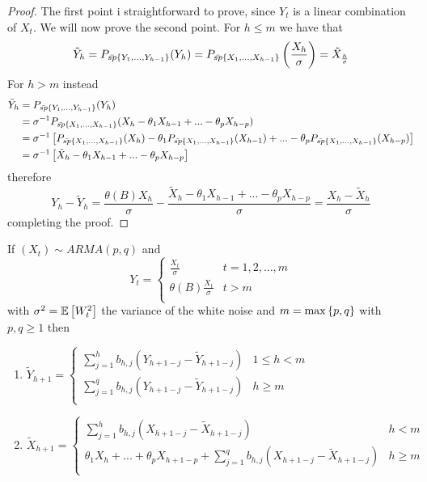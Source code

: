 \begin{proof}
    The first point i straightforward to prove, since $Y_t$ is a linear combination of $X_t$. We will now prove the second point. For $h\le m$ we have that
    \[
      \tilde{Y}_h=P_{\bar{sp}\left\{Y_1,...,Y_{h-1}\right\}}(Y_h)=P_{\bar{sp}\left\{X_1,...,X_{h-1}\right\}}\left(\frac{X_h}{\sigma}\right)=\tilde{X}_{\frac{h}{\sigma}}  
    \]
    For $h>m$ instead
    \begin{equation*}
        \begin{split}
            \tilde{Y}_h&=P_{\bar{sp}\left\{Y_1,...,Y_{h-1}\right\}}(Y_h)\\
            &=\sigma^{-1}P_{\bar{sp}\left\{X_1,...,X_{h-1}\right\}}(X_h-\theta_1X_{h-1}+...-\theta_pX_{h-p})\\
            &=\sigma^{-1}\left[P_{\bar{sp}\left\{X_1,...,X_{h-1}\right\}}(X_h)-\theta_1P_{\bar{sp}\left\{X_1,...,X_{h-1}\right\}}(X_{h-1})+...-\theta_pP_{\bar{sp}\left\{X_1,...,X_{h-1}\right\}}(X_{h-p})\right]\\
            &=\sigma^{-1}\left[\tilde{X}_h-\theta_1X_{h-1}+...-\theta_pX_{h-p}\right]\\
        \end{split}
    \end{equation*}
    therefore
    \[
        Y_h-\tilde{Y}_h=\frac{\theta(B)X_h}{\sigma}-\frac{\tilde{X}_h-\theta_1X_{h-1}+...-\theta_pX_{h-p}}{\sigma}=\frac{X_h-\tilde{X}_h}{\sigma}
    \]  
    completing the proof.
\end{proof}

\begin{proposition}
    If $(X_t)\sim ARMA(p,q)$ and    
    \[
        Y_t=
        \begin{cases}
            \frac{X_t}{\sigma}&t=1,2,...,m\\
            \theta(B)\frac{X_t}{\sigma}&t>m\\
        \end{cases}  
    \]
    with $\sigma^2=\mathbb{E}\left[W_t^2\right]$ the variance of the white noise and $m=\max\left\{p,q\right\}$ with $p,q\ge1$ then
    \begin{enumerate}
        \item $\tilde{Y}_{h+1}=
            \begin{cases}
                \sum_{j=1}^hb_{h,j}(Y_{h+1-j}-\tilde{Y}_{h+1-j})&1\le h<m\\
                \sum_{j=1}^qb_{h,j}(Y_{h+1-j}-\tilde{Y}_{h+1-j})&h\ge m\\
            \end{cases}$
        \item $\tilde{X}_{h+1}=
            \begin{cases}
                \sum_{j=1}^hb_{h,j}(X_{h+1-j}-\tilde{X}_{h+1-j})&h<m\\
                \theta_1X_h+...+\theta_pX_{h+1-p}+\sum_{j=1}^qb_{h,j}(X_{h+1-j}-\tilde{X}_{h+1-j})&h\ge m\\
            \end{cases}$
    \end{enumerate}
\end{proposition}

